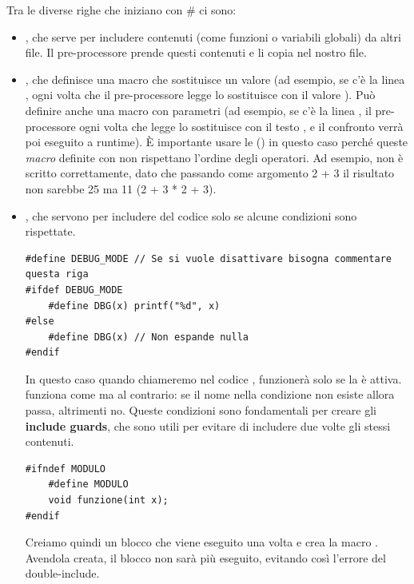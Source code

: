 \documentclass[11pt, a4paper, titlepage, oneside]{scrbook}
\begin{document}
Tra le diverse righe che iniziano con \# ci sono:
\begin{itemize}
    \item {}, che serve per includere contenuti (come funzioni o variabili globali) da altri file. Il pre-processore prende questi contenuti e li copia nel nostro file. 
    \item {}, che definisce una macro che sostituisce un valore (ad esempio, se c'è la linea , ogni volta che il pre-processore legge  lo sostituisce con il valore ). Può definire anche una macro con parametri (ad esempio, se c'è la linea , il pre-processore ogni volta che legge  lo sostituisce con il testo , e il confronto verrà poi eseguito a runtime). È importante usare le () in questo caso perché queste \textit{macro} definite con  non rispettano l'ordine degli operatori. Ad esempio,  non è scritto correttamente, dato che passando come argomento 2 + 3 il risultato non sarebbe 25 ma 11 (2 + 3 * 2 + 3).
    \item {}, che servono per includere del codice solo se alcune condizioni sono rispettate. 
    \begin{lstlisting}[style=C]
#define DEBUG_MODE // Se si vuole disattivare bisogna commentare questa riga
#ifdef DEBUG_MODE
    #define DBG(x) printf("%d", x)
#else
    #define DBG(x) // Non espande nulla
#endif
    \end{lstlisting}
        In questo caso quando chiameremo nel codice , funzionerà solo se la  è attiva.  funziona come  ma al contrario: se il nome nella condizione non esiste allora passa, altrimenti no. Queste condizioni sono fondamentali per creare gli \textbf{include guards}, che sono utili per evitare di includere due volte gli stessi contenuti. 
        \begin{lstlisting}[style=C]
#ifndef MODULO
    #define MODULO
    void funzione(int x);
#endif        
        \end{lstlisting}
        Creiamo quindi un blocco  che viene eseguito una volta e crea la macro . Avendola creata, il blocco  non sarà più eseguito, evitando così l'errore del double-include.
\end{itemize}
\end{document}
